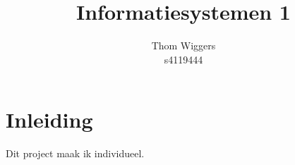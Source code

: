 \documentclass{article}
\author{Thom Wiggers\\ s4119444}
\title{Informatiesystemen 1}
\begin{document}
\maketitle
\section{Inleiding}
Dit project maak ik individueel. 
\end{document}
